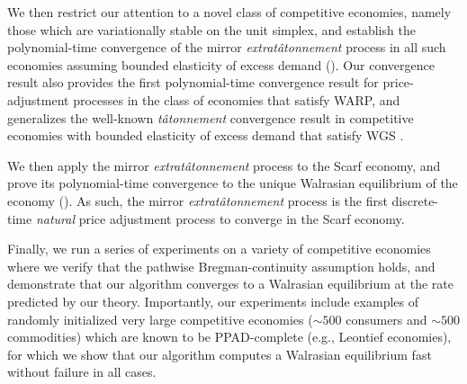 We then restrict our attention to a novel class of competitive economies, namely those which are variationally stable on the unit simplex, and establish the polynomial-time convergence of the mirror \emph{extrat\^atonnement} process in all such economies assuming bounded elasticity of excess demand (). Our convergence result also provides the first polynomial-time convergence result for price-adjustment processes in the class of economies that satisfy WARP, and generalizes the well-known \emph{t\^atonnement\/} convergence result in competitive economies with bounded elasticity of excess demand that satisfy WGS \cite{codenotti2005market}.

We then apply the mirror \emph{extrat\^atonnement} process to the Scarf economy, and prove its polynomial-time convergence to the unique Walrasian equilibrium of the economy (). As such, the mirror \emph{extrat\^atonnement\/} process is the first discrete-time \emph{natural} price adjustment process to converge in the Scarf economy.

Finally, we run a series of experiments on a variety of competitive economies where we verify that the pathwise Bregman-continuity assumption holds, and demonstrate that our algorithm converges to a Walrasian equilibrium at the rate predicted by our theory. Importantly, our experiments include examples of randomly initialized very large competitive economies ($\sim 500$ consumers and $\sim 500$ commodities) which are known to be PPAD-complete (e.g., Leontief economies), for which we show that our algorithm computes a Walrasian equilibrium fast without failure in all cases. 
